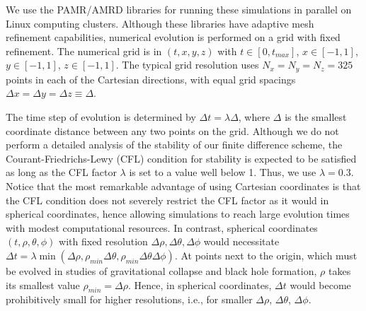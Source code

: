 \documentclass[a4paper,11pt]{article}
\numberwithin{equation}{section}
\begin{document}
We use the PAMR/AMRD libraries \cite{PAMR} for running these simulations in parallel on Linux computing clusters.
Although these libraries have adaptive mesh refinement capabilities, numerical evolution is performed on a grid with fixed refinement.
The numerical grid is in $(t,x,y,z)$ with $t \in [0,t_{max}]$, $x \in [-1,1]$, $y \in [-1,1]$, $z \in [-1,1]$.
The typical grid resolution uses $N_x=N_y=N_z=325$ points in each of the Cartesian directions, with equal grid spacings $\Delta x = \Delta y = \Delta z\equiv \Delta$. 

The time step of evolution is determined by $\Delta t=\lambda \Delta$, where $\Delta$ is the smallest coordinate distance between any two points on the grid.
Although we do not perform a detailed analysis of the stability of our finite difference scheme, the Courant-Friedrichs-Lewy (CFL) condition for stability is expected to be satisfied as long as the CFL factor $\lambda$ is set to a value well below 1. Thus, we use $\lambda=0.3$. Notice that the most remarkable advantage of using Cartesian coordinates is that the CFL condition does not severely restrict the CFL factor as it would in spherical coordinates, hence allowing simulations to reach large evolution times with modest computational resources.
In contrast, spherical coordinates $(t,\rho,\theta,\phi)$ with fixed resolution $\Delta\rho,\Delta\theta,\Delta\phi$ would necessitate $\Delta t = \lambda \min(\Delta\rho, \rho_{min} \Delta\theta, \rho_{min} \Delta\theta \Delta\phi)$.
At points next to the origin, which must be evolved in studies of gravitational collapse and black hole formation, $\rho$ takes its smallest value $\rho_{min}=\Delta\rho$. 
Hence, in spherical coordinates, $\Delta t$ would become prohibitively small for higher resolutions, i.e., for smaller $\Delta\rho$, $\Delta\theta$, $\Delta\phi$.
\end{document}
